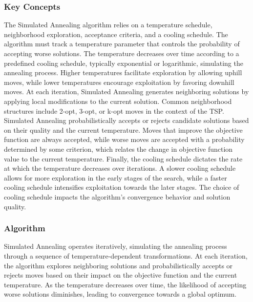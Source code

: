 \documentclass{article}
\begin{document}
\subsubsection{Key Concepts}
The Simulated Annealing algorithm relies on a temperature schedule, neighborhood exploration, acceptance criteria, and a cooling schedule. The algorithm must track a temperature parameter that controls the probability of accepting worse solutions. The temperature decreases over time according to a predefined cooling schedule, typically exponential or logarithmic, simulating the annealing process. Higher temperatures facilitate exploration by allowing uphill moves, while lower temperatures encourage exploitation by favoring downhill moves. At each iteration, Simulated Annealing generates neighboring solutions by applying local modifications to the current solution. Common neighborhood structures include 2-opt, 3-opt, or k-opt moves in the context of the TSP. Simulated Annealing probabilistically accepts or rejects candidate solutions based on their quality and the current temperature. Moves that improve the objective function are always accepted, while worse moves are accepted with a probability determined by some criterion, which relates the change in objective function value to the current temperature. Finally, the cooling schedule dictates the rate at which the temperature decreases over iterations. A slower cooling schedule allows for more exploration in the early stages of the search, while a faster cooling schedule intensifies exploitation towards the later stages. The choice of cooling schedule impacts the algorithm's convergence behavior and solution quality.

\subsubsection{Algorithm}
Simulated Annealing operates iteratively, simulating the annealing process through a sequence of temperature-dependent transformations. At each iteration, the algorithm explores neighboring solutions and probabilistically accepts or rejects moves based on their impact on the objective function and the current temperature. As the temperature decreases over time, the likelihood of accepting worse solutions diminishes, leading to convergence towards a global optimum.
\end{document}
